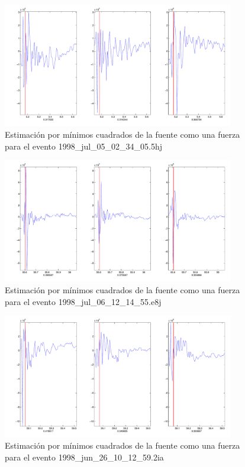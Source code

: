 \begin{figure}[H]
\includegraphics[width=0.9\textwidth,height=0.4\textheight]{linea_timerev/figuras/plotSrcEv7src.pdf}
\caption{Estimación por mínimos cuadrados de la fuente como una fuerza para el
evento 1998\_jul\_05\_02\_34\_05.5hj}
\end{figure}
\begin{figure}[H]
\includegraphics[width=0.9\textwidth,height=0.4\textheight]{linea_timerev/figuras/plotSrcEv8src.pdf}
\caption{Estimación por mínimos cuadrados de la fuente como una fuerza para el
evento 1998\_jul\_06\_12\_14\_55.e8j}
\end{figure}
\begin{figure}[H]
\includegraphics[width=0.9\textwidth,height=0.4\textheight]{linea_timerev/figuras/plotSrcEv9src.pdf}
\caption{Estimación por mínimos cuadrados de la fuente como una fuerza para el
evento 1998\_jun\_26\_10\_12\_59.2ia}
\end{figure}
